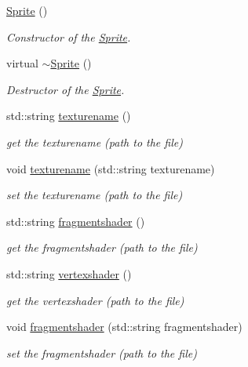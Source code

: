 \begin{DoxyCompactItemize}
\item 
\hyperlink{class_sprite_a12cba3ac1868418add3c4d95ce87e615}{Sprite} ()
\begin{DoxyCompactList}\small\item\em Constructor of the \hyperlink{class_sprite}{Sprite}. \end{DoxyCompactList}\item 
\mbox{\label{class_sprite_a8accab430f9d90ae5117b57d67e32b84}} 
virtual \hyperlink{class_sprite_a8accab430f9d90ae5117b57d67e32b84}{$\sim$\+Sprite} ()
\begin{DoxyCompactList}\small\item\em Destructor of the \hyperlink{class_sprite}{Sprite}. \end{DoxyCompactList}\item 
std\+::string \hyperlink{class_sprite_aa82471010f1e9e5fb6e641d3f4601965}{texturename} ()
\begin{DoxyCompactList}\small\item\em get the texturename (path to the file) \end{DoxyCompactList}\item 
void \hyperlink{class_sprite_a53c2368c7940851a59a4717c0909e828}{texturename} (std\+::string texturename)
\begin{DoxyCompactList}\small\item\em set the texturename (path to the file) \end{DoxyCompactList}\item 
std\+::string \hyperlink{class_sprite_a62f75a2c234025b6cfc6525bd4ae1da8}{fragmentshader} ()
\begin{DoxyCompactList}\small\item\em get the fragmentshader (path to the file) \end{DoxyCompactList}\item 
std\+::string \hyperlink{class_sprite_aae341238d43e34f9e479355f72902cda}{vertexshader} ()
\begin{DoxyCompactList}\small\item\em get the vertexshader (path to the file) \end{DoxyCompactList}\item 
void \hyperlink{class_sprite_a7934a50c082a996333a02d5d8196cfa3}{fragmentshader} (std\+::string fragmentshader)
\begin{DoxyCompactList}\small\item\em set the fragmentshader (path to the file) \end{DoxyCompactList}\item 

\end{DoxyCompactItemize}
